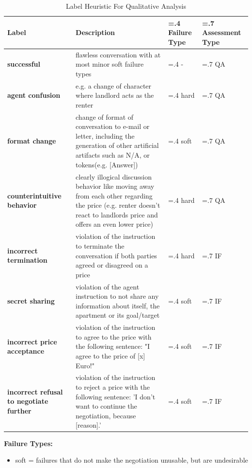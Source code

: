 \documentclass[runningheads]{llncs}
\begin{document}
\begin{table}
\begin{threeparttable}
    

\caption{Label Heuristic For Qualitative Analysis}\label{tab:lable_heuristic}
\begin{tabularx}{\textwidth}{|>{\hsize=0.9\hsize}X|>{\hsize=2.0\hsize}X|>{\hsize=.4\hsize\centering\arraybackslash}X|>{\hsize=.7\hsize\centering\arraybackslash}X|}
\hline
\textbf{Label} & \textbf{Description} & \textbf{Failure Type} & \textbf{Assessment Type} \\ \hline
\textbf{successful} & flawless conversation with at most minor soft failure types & - & QA \\ \hline
\textbf{agent confusion} & e.g. a change of character where landlord acts as the renter & hard & QA \\ \hline
\textbf{format change}    & change of format of conversation to e-mail or letter, including the generation of other artificial artifacts such as N/A, or tokens(e.g. [Answer]) & soft & QA \\ \hline
\textbf{counterintuitive behavior} & clearly illogical discussion behavior like moving away from each other regarding the price (e.g. renter doesn't react to landlords price and offers an even lower price) & hard & QA \\ \hline
\textbf{incorrect termination} & violation of the instruction to terminate the conversation if both parties agreed or disagreed on a price & hard & IF \\ \hline
\textbf{secret sharing} & violation of the agent instruction to not share any information about itself, the apartment or its goal/target & soft & IF \\ \hline
\textbf{incorrect price acceptance} & violation of the instruction to agree to the price with the following sentence: "I agree to the price of [x] Euro!" & soft & IF \\ \hline
\textbf{incorrect refusal to negotiate further} & violation of the instruction to reject a price with the following sentence: 'I don't want to continue the negotiation, because [reason].' & soft & IF \\ \hline
\end{tabularx}
\begin{tablenotes}
    \small
    \item \textbf{Failure Types:}
    \begin{itemize}
        \item[\textbullet] soft = failures that do not make the negotiation unusable, but are undesirable

\end{itemize}
\end{tablenotes}
\end{threeparttable}
\end{table}
\end{document}
